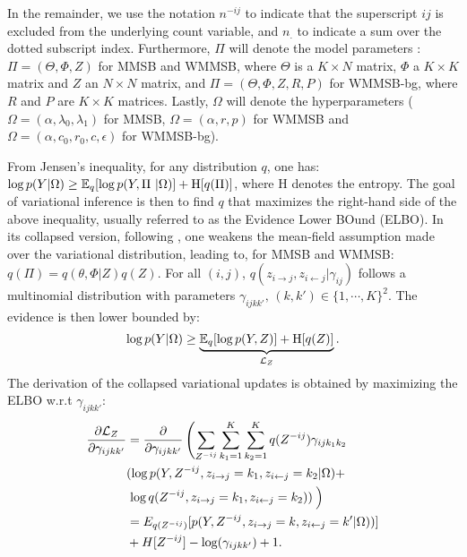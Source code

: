 In the remainder, we use the notation $n^{-ij}$ to indicate that the superscript $ij$ is excluded from the underlying count variable, and $n_{\bm{.}}$ to indicate a sum over the dotted subscript index. Furthermore, $\Pi$ will denote the model parameters : $\Pi = (\Theta,\Phi,Z)$ for MMSB and WMMSB, where $\Theta$ is a $K \times N$ matrix, $\Phi$ a $K \times K$ matrix and $Z$ an $N \times N$ matrix, and $\Pi = (\Theta,\Phi,Z,R,P)$ for WMMSB-bg, where $R$ and $P$ are $K \times K$ matrices. Lastly, $\Omega$ will denote the hyperparameters ($\Omega = (\alpha,\lambda_0,\lambda_1)$ for MMSB, $\Omega = (\alpha,r,p)$ for WMMSB and $\Omega = (\alpha, c_0, r_0, c, \epsilon)$ for WMMSB-bg).

From Jensen's inequality, for any distribution $q$, one has: $\log p({Y} | \Omega) \ge \mathbb{E}_{q}[\log p({Y}, \Pi\ | \Omega)] + \textrm{H}[q(\Pi)]$,
where $\textrm{H}$ denotes the entropy. The goal of variational inference is then to find $q$ that maximizes the right-hand side of the above inequality, usually referred to as the Evidence Lower BOund (ELBO). In its collapsed version, following \cite{teh2007collapsed}, one weakens the mean-field assumption made over the variational distribution, leading to, for MMSB and WMMSB: $q(\Pi) = q(\theta, \Phi | Z) q(Z)$.
For all $(i,j)$, $q(z_{i \rightarrow j}, z_{i \leftarrow j}|\gamma_{ij})$ follows a multinomial distribution with parameters $\gamma_{ijkk'}, \, (k,k') \in \{1, \cdots, K\}^2$. The evidence is then lower bounded by:
%
\begin{equation*}
\log p({Y}|\Omega) \geq \underbrace{\mathbb{E}_{q}[\log p({Y}, Z)] + \textrm{H}[q(Z)]}_{\mathcal{L}_Z}.
\end{equation*}
%
The derivation of the collapsed variational updates is obtained by maximizing the ELBO w.r.t $\gamma_{ijkk'}$:
%
\begin{align*}
\frac{\partial \mathcal{L}_Z}{\partial \gamma_{ijkk'}} &= \frac{\partial }{\partial \gamma_{ijkk'}} \left( \sum_{{Z}^{-ij}}\sum_{k_1=1}^K\sum_{k_2=1}^K  q({Z}^{-ij}) \gamma_{ijk_1 k_2} \right. \\
& (\log p({Y}, {Z}^{-ij}, z_{i\rightarrow j}=k_1, z_{i\leftarrow j}=k_2|\Omega)+ \\
& \left. \log q({Z}^{-ij}, z_{i\rightarrow j}=k_1, z_{i\leftarrow j}=k_2) ) \frac{}{} \right) \\
& = E_{q({Z}^{-ij})}[ p({Y}, {Z}^{-ij}, z_{i\rightarrow j}=k, z_{i\leftarrow j}=k'|\Omega))] \\
& + H[{Z}^{-ij}] -\log(\gamma_{ijkk'}) +1.
\end{align*}
